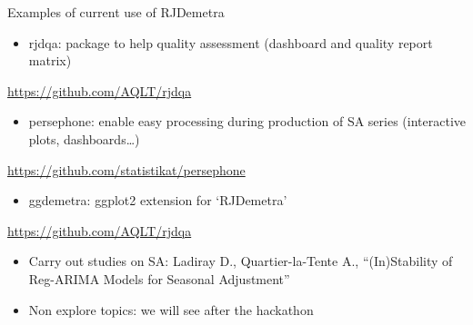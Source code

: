 \documentclass[10pt,xcolor=table,color={dvipsnames,usenames},ignorenonframetext,usepdftitle=false,french]{beamer}
\providecommand{\tightlist}{%
  \setlength{\parskip}{0pt}
  }
\begin{document}
\begin{frame}{Examples of current use of RJDemetra}
\protect\hypertarget{examples-of-current-use-of-rjdemetra}{}

\begin{itemize}
\tightlist
\item
  rjdqa: package to help quality assessment (dashboard and quality
  report matrix)
\end{itemize}

\faGithub{} \url{https://github.com/AQLT/rjdqa}

\begin{itemize}
\tightlist
\item
  persephone: enable easy processing during production of SA series
  (interactive plots, dashboards\ldots{})
\end{itemize}

\faGithub{} \url{https://github.com/statistikat/persephone}

\begin{itemize}
\tightlist
\item
  ggdemetra: ggplot2 extension for `RJDemetra'
\end{itemize}

\faGithub{} \url{https://github.com/AQLT/rjdqa}

\begin{itemize}
\item
  Carry out studies on SA: Ladiray D., Quartier-la-Tente A.,
  ``(In)Stability of Reg-ARIMA Models for Seasonal Adjustment''
\item
  Non explore topics: we will see after the hackathon
\end{itemize}

\end{frame}
\end{document}
